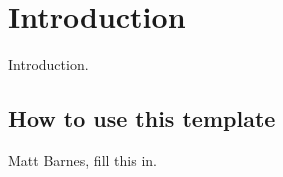 
\chapter{Introduction} \label{secIntro}

Introduction.

\section{How to use this template}

Matt Barnes, fill this in.
